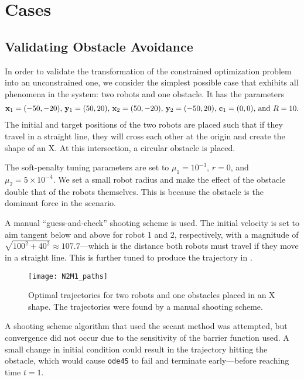 \documentclass[11pt]{article}
\begin{document}
\section{Cases}

\subsection{Validating Obstacle Avoidance}

In order to validate the transformation of the constrained optimization problem into an unconstrained one, we consider the simplest possible case that exhibits all phenomena in the system: two robots and one obstacle. It has the parameters
\begin{align*}
	\mathbf{x}_1 = (-50,-20),\,\mathbf{y}_1 = (50,20),\,\mathbf{x}_2 = (50,-20),\,\mathbf{y}_2 = (-50,20),\,\mathbf{c}_1 = (0,0),\, \text{and } R = 10.
\end{align*}
The initial and target positions of the two robots are placed such that if they travel in a straight line, they will cross each other at the origin and create the shape of an X. At this intersection, a circular obstacle is placed.

The soft-penalty tuning parameters are set to \(\mu_1 = 10^{-3}\), \(r = 0\), and \(\mu_2 = 5 \times 10^{-4}\). We set a small robot radius and make the effect of the obstacle double that of the robots themselves. This is because the obstacle is the dominant force in the scenario.

A manual ``guess-and-check'' shooting scheme is used. The initial velocity is set to aim tangent below and above for robot 1 and 2, respectively, with a magnitude of \(\sqrt{100^2 + 40^2} \approx 107.7\)---which is the distance both robots must travel if they move in a straight line. This is further tuned to produce the trajectory in .

\begin{figure}
	\centering
	\texttt{[image: N2M1\_paths]}
	\caption{Optimal trajectories for two robots and one obstacles placed in an X shape. The trajectories were found by a manual shooting scheme.}
	\label{fig:n2m1-paths}
\end{figure}

A shooting scheme algorithm that used the secant method was attempted, but convergence did not occur due to the sensitivity of the barrier function used. A small change in initial condition could result in the trajectory hitting the obstacle, which would cause \texttt{ode45} to fail and terminate early---before reaching time \(t = 1\).
\end{document}
